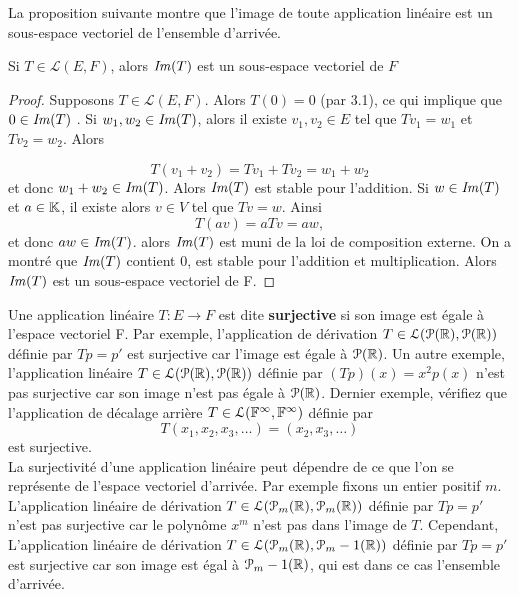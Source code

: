 \documentclass[12pt]{book}
\begin{document}
La proposition suivante montre que l'image de toute application linéaire est un sous-espace vectoriel de l'ensemble d'arrivée.

\begin{prop}
Si $T \in \mathcal{L}(E,F)$, alors $\textrm{\textit{Im}}(T)$ est un sous-espace vectoriel de $F$
\begin{proof}
Supposons $T \in \mathcal{L}(E,F)$. Alors $T(0)=0$ (par 3.1), ce qui implique que $0\in\textrm{\textit{Im}}(T)$ .
Si $w_1,w_2\in\textrm{\textit{Im}}(T)$, alors il existe $v_1,v_2\in E$ tel que $Tv_1=w_1$ et $Tv_2=w_2$. Alors 

\begin{equation*}
    T(v_1 + v_2) = Tv_1 + Tv_2 = w_1 + w_2
\end{equation*}
et donc $w_1 + w_2\in \textrm{\textit{Im}}(T)$. Alors $\textrm{\textit{Im}}(T)$ est stable pour l'addition.
Si $w\in\textrm{\textit{Im}}(T)$ et $a\in\mathbb{K}$, il existe alors $v\in V$ tel que $Tv=w$.
Ainsi
\begin{equation*}
    T(av)=aTv=aw,
\end{equation*}
et donc $aw\in\textrm{\textit{Im}}(T)$. alors $\textrm{\textit{Im}}(T)$ est muni de la loi de composition externe.
On a montré que $\textrm{\textit{Im}}(T)$ contient 0, est stable pour l'addition et multiplication. Alors $\textrm{\textit{Im}}(T)$ est un sous-espace vectoriel de F. 
\end{proof}
\end{prop}

Une application linéaire $T\colon E\rightarrow F$ est dite \textbf{surjective} si son image est égale à l'espace vectoriel F. Par exemple, l'application de dérivation $T\in \mathcal{L}(\mathcal{P}(\mathbb{R}),\mathcal{P}(\mathbb{R}))$ définie par $Tp=p'$ est surjective car l'image est égale à $\mathcal{P}(\mathbb{R})$. Un autre exemple, l'application linéaire  $T\in \mathcal{L}(\mathcal{P}(\mathbb{R}),\mathcal{P}(\mathbb{R}))$ définie par $(Tp)(x)=x^2p(x)$ n'est pas surjective car son image n'est pas égale à $\mathcal{P}(\mathbb{R})$. Dernier exemple, vérifiez que l'application de décalage arrière $T\in \mathcal{L}(\mathbb{F}^\infty, \mathbb{F}^\infty)$ définie par 
\begin{equation*}
     T(x_1, x_2, x_3, \ldots) = (x_2, x_3, \ldots)
\end{equation*}
est surjective.\\
La surjectivité d'une application linéaire peut dépendre de ce que l'on se représente de l'espace vectoriel d'arrivée. Par exemple fixons un entier positif $m$. L'application linéaire de dérivation $T\in \mathcal{L}(\mathcal{P}_m(\mathbb{R}),\mathcal{P}_m(\mathbb{R}))$ définie par $Tp=p'$ n'est pas surjective car le polynôme $x^m$ n'est pas dans l'image de $T$. Cependant,  L'application linéaire de dérivation $T\in \mathcal{L}(\mathcal{P}_m(\mathbb{R}),\mathcal{P}_m-1(\mathbb{R}))$ définie par $Tp=p'$ est surjective car son image est égal à $\mathcal{P}_m-1(\mathbb{R})$, qui est dans ce cas l'ensemble d'arrivée. 
\end{document}
